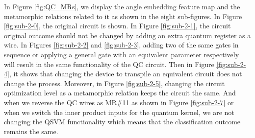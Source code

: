 \documentclass[12pt,a4paper]{article}
\begin{document}
	
	In Figure \ref{fig:QC_MRs}, we display the angle embedding feature map and the metamorphic relations related to it as shown in the eight sub-figures. In Figure \ref{fig:sub-2-0}, the original circuit is shown. In Figure \ref{fig:sub-2-1}, the circuit original outcome should not be changed by adding an extra quantum register as a wire. In Figures \ref{fig:sub-2-2} and \ref{fig:sub-2-3}, adding two of the same gates in sequence or applying a general gate with an equivalent parameter respectively will result in the same functionality of the QC circuit. Then in Figure \ref{fig:sub-2-4}, it shows that changing the device to transpile an equivalent circuit does not change the process. Moreover, in Figure \ref{fig:sub-2-5}, changing the circuit optimization level as a metamorphic relation keeps the circuit the same. And when we reverse the QC wires as MR\#11 as shown in Figure \ref{fig:sub-2-7} or when we switch the inner product inputs for the quantum kernel, we are not changing the QSVM functionality which means that the classification outcome remains the same.
	
\end{document}
